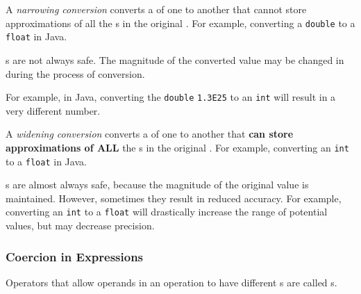 \begin{definition}\label{def:Narrowing_Conversion}
  A \emph{narrowing conversion} converts a  of one  to another that cannot store approximations of all the s in the original .
  For example, converting a \texttt{double} to a \texttt{float} in Java.

  \begin{remark}[Safety]\label{rmk:Narrowing_Conversion-Safety}
    s are not always safe.
    The magnitude of the converted value may be changed in during the process of conversion.

    For example, in Java, converting the \texttt{double} \texttt{1.3E25} to an \texttt{int} will result in a very different number.
  \end{remark}
\end{definition}

\begin{definition}\label{def:Widening_Conversion}
  A \emph{widening conversion} converts a  of one  to another that \textbf{can store approximations of ALL} the s in the original .
  For example, converting an \texttt{int} to a \texttt{float} in Java.

  \begin{remark}[Safety]\label{rmk:Widening_Conversion-Safety}
    s are almost always safe, because the magnitude of the original value is maintained.
    However, sometimes they result in reduced accuracy.
    For example, converting an \texttt{int} to a \texttt{float} will drastically increase the range of potential values, but may decrease precision.
  \end{remark}
\end{definition}

\subsubsection{Coercion in Expressions}\label{subsubsec:Coercion_in_Expressions}
Operators that allow operands in an operation to have different s are called s.

